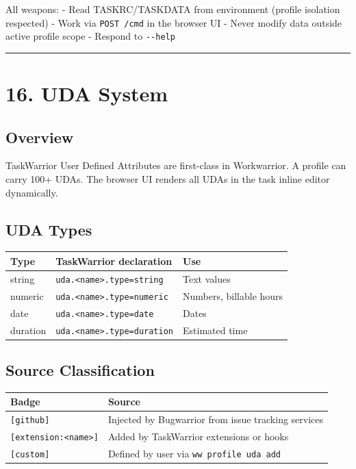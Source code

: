 \documentclass[
]{article}
\newcounter{none} %
\begin{document}
All weapons: - Read TASKRC/TASKDATA from environment (profile isolation
respected) - Work via \texttt{POST\ /cmd} in the browser UI - Never
modify data outside active profile scope - Respond to \texttt{-\/-help}

\begin{center}\rule{0.5\linewidth}{0.5pt}\end{center}

\section{16. UDA System}\label{uda-system}

\subsection{Overview}\label{overview-3}

TaskWarrior User Defined Attributes are first-class in Workwarrior. A
profile can carry 100+ UDAs. The browser UI renders all UDAs in the task
inline editor dynamically.

\subsection{UDA Types}\label{uda-types}

{\def\LTcaptype{none} %
\begin{longtable}[]{@{}lll@{}}
\toprule\noalign{}
Type & TaskWarrior declaration & Use \\
\midrule\noalign{}
\endhead
\bottomrule\noalign{}
\endlastfoot
string & \texttt{uda.\textless{}name\textgreater{}.type=string} & Text
values \\
numeric & \texttt{uda.\textless{}name\textgreater{}.type=numeric} &
Numbers, billable hours \\
date & \texttt{uda.\textless{}name\textgreater{}.type=date} & Dates \\
duration & \texttt{uda.\textless{}name\textgreater{}.type=duration} &
Estimated time \\
\end{longtable}
}

\subsection{Source Classification}\label{source-classification}

{\def\LTcaptype{none} %
\begin{longtable}[]{@{}ll@{}}
\toprule\noalign{}
Badge & Source \\
\midrule\noalign{}
\endhead
\bottomrule\noalign{}
\endlastfoot
\texttt{{[}github{]}} & Injected by Bugwarrior from issue tracking
services \\
\texttt{{[}extension:\textless{}name\textgreater{}{]}} & Added by
TaskWarrior extensions or hooks \\
\texttt{{[}custom{]}} & Defined by user via
\texttt{ww\ profile\ uda\ add} \\
\end{longtable}
}
\end{document}
